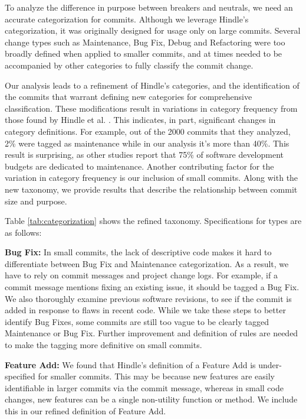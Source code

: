 


To analyze the difference in purpose between breakers and neutrals, we need an accurate categorization for commits.
Although we leverage Hindle's categorization, it was originally designed for usage only on large commits.
Several change types such as Maintenance, Bug Fix, Debug and Refactoring were too broadly defined when applied to smaller commits, and at times needed to be accompanied by other categories to fully classify the commit change.

Our analysis leads to a refinement of Hindle's categories, and the identification of the commits that warrant defining new categories for comprehensive classification.
These modifications result in variations in category frequency from those found by Hindle et al. \cite{Hindle_cate}. This indicates, in part, significant changes in category definitions. For example, out of the 2000 commits that they analyzed, 2\% were tagged as maintenance while in our analysis it's more than 40\%.
This result is surprising, as other studies  \cite{dodaro2015government,redman2008weapon,koskinen2009software} report that 75\% of software development budgets are dedicated to maintenance. Another contributing factor for the variation in category frequency is our inclusion of small commits. Along with the new taxonomy, we provide results that describe the relationship between commit size and purpose.

Table \ref{tab:categorization} shows the refined taxonomy.
Specifications for types are as follows:

\textbf{Bug Fix:} In small commits, the lack of descriptive code makes it hard to differentiate between Bug Fix and Maintenance categorization. 
As a result, we have to rely on commit messages and project change logs. 
For example, if a commit message mentions fixing an existing issue, it should be tagged a Bug Fix. We also thoroughly examine previous software revisions, to see if the commit is added in response to flaws in recent code.
While we take these steps to better identify Bug Fixes, some commits are still too vague to be clearly tagged Maintenance or Bug Fix. 
Further improvement and definition of rules are needed to make the tagging more definitive on small commits.

\textbf{Feature Add:} We found that Hindle's definition of a Feature Add is under-specified for smaller commits.
This may be because new features are easily identifiable in larger commits via the commit message, whereas in small code changes, new features can be a single non-utility function or method. We include this in our refined definition of Feature Add.

